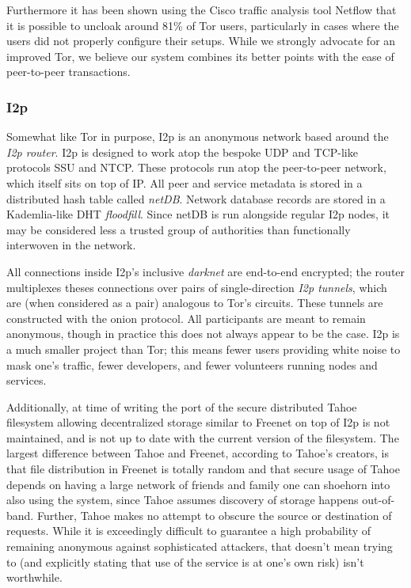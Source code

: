 Furthermore it has been shown using the Cisco traffic analysis tool Netflow that it is possible to uncloak around 81\% of
Tor users, particularly in cases where the users did not properly configure their setups. While we strongly advocate for
an improved Tor, we believe our system combines its better points with the ease of peer-to-peer transactions.

\subsubsection*{I2p}

Somewhat like Tor in purpose, I2p is an anonymous network based around the \textit{I2p router}. I2p is designed to work
atop the bespoke UDP and TCP-like protocols SSU and NTCP. These protocols run atop the peer-to-peer network, which itself
sits on top of IP. All peer and service metadata is stored in a distributed hash table called
\textit{netDB}. Network database records are stored in a Kademlia-like DHT \textit{floodfill}.
Since netDB is run alongside regular I2p nodes, it may be considered less a trusted
group of authorities than functionally interwoven in the network.

All connections inside I2p's inclusive \textit{darknet} are end-to-end encrypted; the router multiplexes theses connections over
pairs of single-direction \textit{I2p tunnels}, which are (when considered as a pair) analogous to Tor's circuits. These tunnels
are constructed with the onion protocol. All participants are meant to remain anonymous, though in practice this does not always
appear to be the case. I2p is a much smaller project than Tor; this means fewer users providing white noise to mask one's traffic,
fewer developers, and fewer volunteers running nodes and services.

Additionally, at time of writing the port of the secure distributed Tahoe filesystem allowing decentralized storage similar
to Freenet on top of I2p is not maintained, and is not up to date with the current version of the filesystem. The largest difference
between Tahoe and Freenet, according to Tahoe's creators, is that file distribution in Freenet is totally random and that secure
usage of Tahoe depends on having a large network of friends and family one can shoehorn into also using the system, since Tahoe assumes
discovery of storage happens out-of-band. Further, Tahoe makes no attempt to obscure the source or destination of
requests. While it is exceedingly difficult to guarantee a
high probability of remaining anonymous against sophisticated attackers, that doesn't mean trying to (and explicitly stating that
use of the service is at one's own risk) isn't worthwhile.

